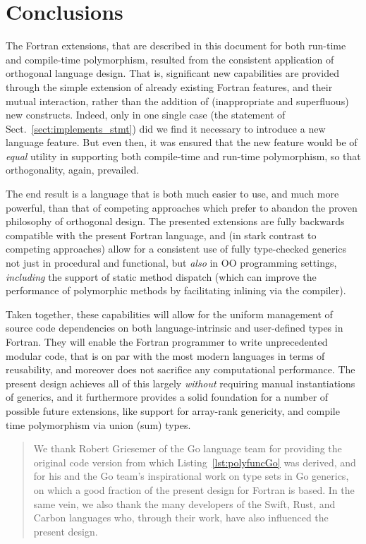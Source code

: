 \documentclass[11pt,oneside]{report}
\newcommand{\code}[1]{{\selectfont\ttfamily{#1}}}
\begin{document}
\chapter{Conclusions}

The Fortran extensions, that are described in this document for both
run-time and compile-time polymorphism, resulted from the consistent
application of orthogonal language design. That is, significant new
capabilities are provided through the simple extension of already
existing Fortran features, and their mutual interaction, rather than
the addition of (inappropriate and superfluous) new
constructs. Indeed, only in one single case (the \code{implements}
statement of Sect.~\ref{sect:implements_stmt}) did we find it
necessary to introduce a new language feature. But even then, it was
ensured that the new feature would be of \emph{equal} utility in
supporting both compile-time and run-time polymorphism, so that
orthogonality, again, prevailed.

The end result is a language that is both much easier to use, and much
more powerful, than that of competing approaches which prefer to
abandon the proven philosophy of orthogonal design. The presented
extensions are fully backwards compatible with the present Fortran
language, and (in stark contrast to competing approaches) allow for a
consistent use of fully type-checked generics not just in procedural
and functional, but \emph{also} in OO programming settings,
\emph{including} the support of static method dispatch (which can
improve the performance of polymorphic methods by facilitating
inlining via the compiler).

Taken together, these capabilities will allow for the uniform
management of source code dependencies on both language-intrinsic and
user-defined types in Fortran. They will enable the Fortran programmer
to write unprecedented modular code, that is on par with the most
modern languages in terms of reusability, and moreover does not
sacrifice any computational performance. The present design achieves
all of this largely \emph{without} requiring manual instantiations of
generics, and it furthermore provides a solid foundation for a number
of possible future extensions, like support for array-rank genericity,
and compile time polymorphism via union (sum) types.

\printbibliography

\renewcommand{\abstractname}{Acknowledgements}

\begin{abstract}
We thank Robert Griesemer of the Go language team for providing the
original code version from which Listing~\ref{lst:polyfuncGo} was
derived, and for his and the Go team's inspirational work on type sets
in Go generics, on which a good fraction of the present design for
Fortran is based. In the same vein, we also thank the many developers
of the Swift, Rust, and Carbon languages who, through their work, have
also influenced the present design.
\end{abstract}
\end{document}

